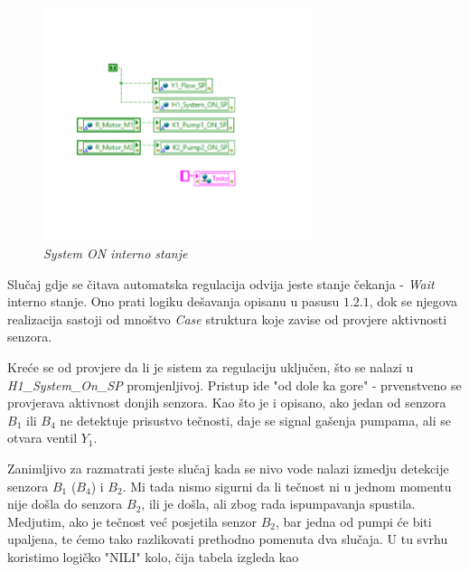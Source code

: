 \documentclass[12pt, titlepage]{article}
\begin{document}
                \begin{figure}[ht]
                    \centering
                    \includegraphics[width=0.7\textwidth]{Slike/HAND_AUTO.vi AUTO SYSTEM ON.png}
                    \caption{\textit{System ON interno stanje}}
                \end{figure}

                Slučaj gdje se čitava automatska regulacija odvija jeste stanje čekanja - \textit{Wait} 
                interno stanje. Ono prati logiku dešavanja opisanu u pasusu $1.2.1$, dok se njegova 
                realizacija sastoji od mnoštvo \textit{Case} struktura koje zavise od 
                provjere aktivnosti senzora.

                Kreće se od provjere da li je sistem za regulaciju uključen, što se nalazi u 
                \textit{H1\_System\_On\_SP} promjenljivoj. Pristup ide "od dole ka gore" - prvenstveno se 
                provjerava aktivnost donjih senzora. Kao što je i opisano, ako jedan od senzora 
                $B_1$ ili $B_4$ ne detektuje prisustvo tečnosti, daje se signal gašenja pumpama, ali se 
                otvara ventil $Y_1$.

                Zanimljivo za razmatrati jeste slučaj kada se nivo vode nalazi izmedju detekcije senzora 
                $B_1$ ($B_4$) i $B_2$. Mi tada nismo sigurni da li tečnost ni u jednom momentu nije došla 
                do senzora $B_2$, ili je došla, ali zbog rada ispumpavanja spustila. Medjutim, ako je tečnost
                već posjetila senzor $B_2$, bar jedna od pumpi će biti upaljena, te ćemo tako razlikovati
                prethodno pomenuta dva slučaja. U tu svrhu koristimo logičko "NILI" kolo, čija tabela izgleda kao

                \newpage
\end{document}
